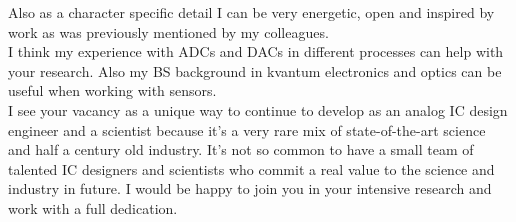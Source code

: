 \documentclass[12pt,a4paper,roman]{moderncv}        %
\begin{document}
Also as a character specific detail I can be very energetic, open and inspired by work as was previously mentioned by my colleagues.\\
\hspace{1cm}I think my experience with ADCs and DACs in different  processes can help with your research. Also my BS background in kvantum electronics and optics can be useful when working with sensors.\\
\hspace{1cm}I see your vacancy as a unique way to continue to develop as an analog IC design  engineer and a scientist because it’s a very rare mix of state-of-the-art science and half a century old industry. It’s not so common to have a small team of talented IC designers and scientists who commit a real value to the science and industry in future. I would be happy to join you in your intensive research and work with a full dedication. 





\vspace{0.1cm}


\makeletterclosing
\end{document}
